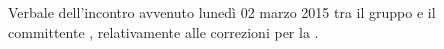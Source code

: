 Verbale dell'incontro avvenuto lunedì 02 marzo 2015 tra il gruppo \gruppo e il committente \committente, relativamente alle correzioni per la \RR.
